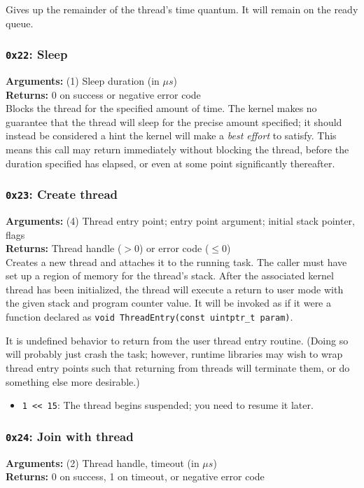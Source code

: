 \documentclass[11pt]{article}
\begin{document}
Gives up the remainder of the thread's time quantum. It will remain on the ready queue.

\subsubsection{{\tt 0x22}: Sleep}
\textbf{Arguments:} (1) Sleep duration (in $\mu s$) \\
\textbf{Returns:} 0 on success or negative error code \\

Blocks the thread for the specified amount of time. The kernel makes no guarantee that the thread will sleep for the precise amount specified; it should instead be considered a hint the kernel will make a \textit{best effort} to satisfy. This means this call may return immediately without blocking the thread, before the duration specified has elapsed, or even at some point significantly thereafter.

\subsubsection{{\tt 0x23}: Create thread}
\textbf{Arguments:} (4) Thread entry point; entry point argument; initial stack pointer, flags \\
\textbf{Returns:} Thread handle ($>0$) or error code ($\leq0$) \\

Creates a new thread and attaches it to the running task. The caller must have set up a region of memory for the thread's stack. After the associated kernel thread has been initialized, the thread will execute a return to user mode with the given stack and program counter value. It will be invoked as if it were a function declared as \texttt{void ThreadEntry(const uintptr\_t param)}.

It is undefined behavior to return from the user thread entry routine. (Doing so will probably just crash the task; however, runtime libraries may wish to wrap thread entry points such that returning from threads will terminate them, or do something else more desirable.)

\begin{itemize}
\item \texttt{1 << 15}: The thread begins suspended; you need to resume it later.
\end{itemize}

\subsubsection{{\tt 0x24}: Join with thread}
\textbf{Arguments:} (2) Thread handle, timeout (in $\mu s$) \\
\textbf{Returns:} 0 on success, 1 on timeout, or negative error code \\
\end{document}
